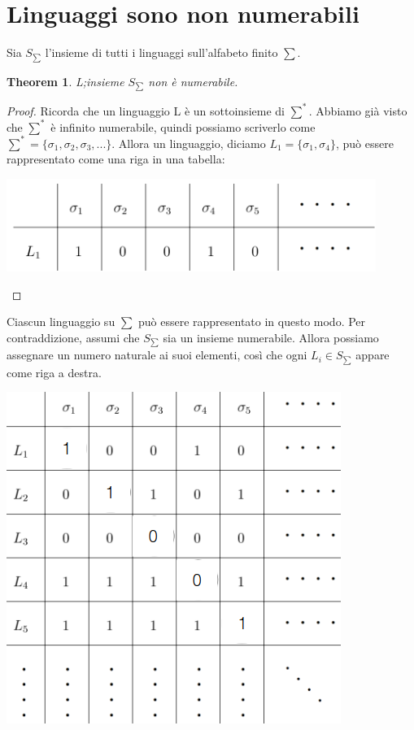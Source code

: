 \documentclass[a4paper, 12pt]{article}
\newtheorem{theorem}{Theorem}[section]
\begin{document}
\section{Linguaggi sono non numerabili}

Sia $S_{\sum}$ l'insieme di tutti i linguaggi sull'alfabeto finito $\sum$.
\begin{theorem}
L;insieme $S_{\sum}$ non \`e numerabile.
\end{theorem}
\begin{proof}
Ricorda che un linguaggio L \`e un sottoinsieme di $\sum^*$. Abbiamo gi\`a visto che $\sum^*$ \`e infinito numerabile, quindi possiamo scriverlo come $\sum^* = \{\sigma_1, \sigma_2,\sigma_3,...\}$. Allora un linguaggio, diciamo $L_1 = \{\sigma_1,\sigma_4\}$, pu\`o essere rappresentato come una riga in una tabella:\\
\begin{center}
\includegraphics[scale=0.5]{tabella_linguaggi.png}

\end{center}
\end{proof}
Ciascun linguaggio su $\sum$ pu\`o essere rappresentato in questo modo. Per contraddizione, assumi che $S_{\sum}$ sia un insieme numerabile. Allora possiamo assegnare un numero naturale ai suoi elementi, cos\`i che ogni $L_i \in S_{\sum}$ appare come riga a destra.\\ \begin{center}
\includegraphics[scale=0.5]{tabella_linguaggi2.png}
\end{center}
\end{document}
